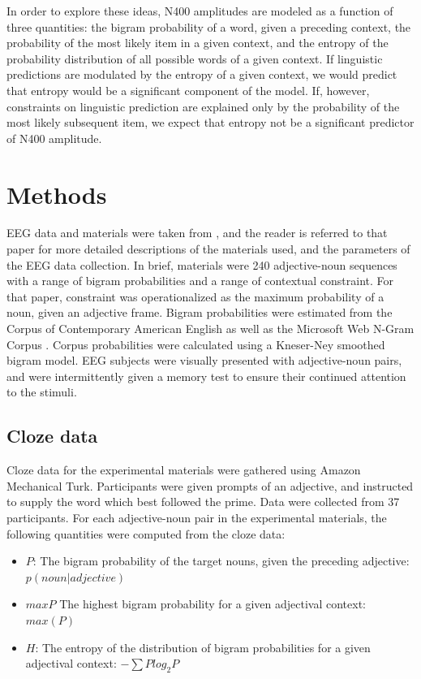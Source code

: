 \documentclass{article}
\begin{document}
In order to explore these ideas, N400 amplitudes are modeled as a function of three quantities: the bigram probability of a word, given a preceding context, the probability of the most likely item in a given context, and the entropy of the probability distribution of all possible words of a given context. If linguistic predictions are modulated by the entropy of a given context, we would predict that entropy would be a significant component of the model. If, however, constraints on linguistic prediction are explained only by the probability of the most likely subsequent item, we expect that entropy not be a significant predictor of N400 amplitude.

\section{Methods}

EEG data and materials were taken from \cite{lau2014}, and the reader is referred to that paper for more detailed descriptions of the materials used, and the parameters of the EEG data collection. In brief, materials were 240 adjective-noun sequences with a range of bigram probabilities and a range of contextual constraint. For that paper, constraint was operationalized as the maximum probability of a noun, given an adjective frame. Bigram probabilities were estimated from the Corpus of Contemporary American English \cite{davies2008} as well as the Microsoft Web N-Gram Corpus \cite{wang2010overview}. Corpus probabilities were calculated using a Kneser-Ney smoothed \cite{kneser1995improved} bigram model. EEG subjects were visually presented with adjective-noun pairs, and were intermittently given a memory test to ensure their continued attention to the stimuli. 

\subsection{Cloze data}

Cloze data for the experimental materials were gathered using Amazon Mechanical Turk. Participants were given prompts of an adjective, and instructed to supply the word which best followed the prime. Data were collected from 37 participants. For each adjective-noun pair in the experimental materials, the following quantities were computed from the cloze data:

\begin{itemize}
\item $P$: The bigram probability of the target nouns, given the preceding adjective: $p(noun|adjective)$
\item $maxP$ The highest bigram probability for a given adjectival context: $max(P)$
\item $H$: The entropy of the distribution of bigram probabilities for a given adjectival context: $-\sum{}Plog_2P$
\end{itemize}
\end{document}
